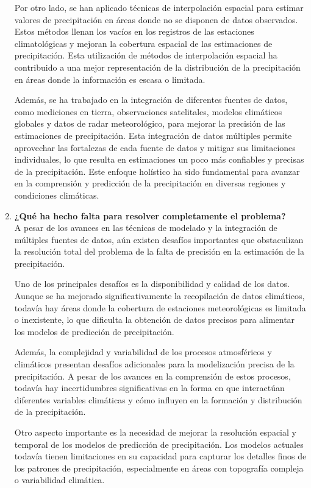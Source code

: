 \documentclass{article}
\begin{document}
\begin{enumerate}
    Por otro lado, se han aplicado técnicas de interpolación espacial para estimar valores de precipitación en áreas donde no se disponen de datos observados. Estos métodos llenan los vacíos en los registros de las estaciones climatológicas y mejoran la cobertura espacial de las estimaciones de precipitación. Esta utilización de métodos de interpolación espacial ha contribuido a una mejor representación de la distribución de la precipitación en áreas donde la información es escasa o limitada.

    Además, se ha trabajado en la integración de diferentes fuentes de datos, como mediciones en tierra, observaciones satelitales, modelos climáticos globales y datos de radar meteorológico, para mejorar la precisión de las estimaciones de precipitación. Esta integración de datos múltiples permite aprovechar las fortalezas de cada fuente de datos y mitigar sus limitaciones individuales, lo que resulta en estimaciones un poco más confiables y precisas de la precipitación. Este enfoque holístico ha sido fundamental para avanzar en la comprensión y predicción de la precipitación en diversas regiones y condiciones climáticas.

    
    
    \item \textbf{¿Qué ha hecho falta para resolver completamente el problema?}\\

    A pesar de los avances en las técnicas de modelado y la integración de múltiples fuentes de datos, aún existen desafíos importantes que obstaculizan la resolución total del problema de la falta de precisión en la estimación de la precipitación.

    Uno de los principales desafíos es la disponibilidad y calidad de los datos. Aunque se ha mejorado significativamente la recopilación de datos climáticos, todavía hay áreas donde la cobertura de estaciones meteorológicas es limitada o inexistente, lo que dificulta la obtención de datos precisos para alimentar los modelos de predicción de precipitación.

    Además, la complejidad y variabilidad de los procesos atmosféricos y climáticos presentan desafíos adicionales para la modelización precisa de la precipitación. A pesar de los avances en la comprensión de estos procesos, todavía hay incertidumbres significativas en la forma en que interactúan diferentes variables climáticas y cómo influyen en la formación y distribución de la precipitación.

    Otro aspecto importante es la necesidad de mejorar la resolución espacial y temporal de los modelos de predicción de precipitación. Los modelos actuales todavía tienen limitaciones en su capacidad para capturar los detalles finos de los patrones de precipitación, especialmente en áreas con topografía compleja o variabilidad climática.


\end{enumerate}
\end{document}
